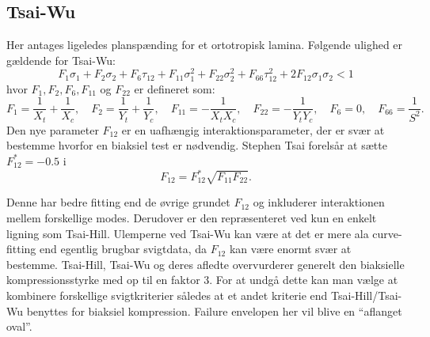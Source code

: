 \subsection{Tsai-Wu}
Her antages ligeledes planspænding for et ortotropisk lamina.
Følgende ulighed er gældende for Tsai-Wu:
\begin{equation*}
  F_1 \sigma_1 + F_2 \sigma_2 + F_6 \tau_{12} + F_{11} \sigma_1^2 + F_{22} \sigma_2^2 + F_{66}\tau_{12}^2 + 2 F_{12} \sigma_1 \sigma_2 < 1
\end{equation*}
hvor $F_1, F_2, F_6, F_{11}$ og $F_{22}$ er defineret som:
\begin{equation*}
  F_1 = \frac{1}{X_t} + \frac{1}{X_c}, \quad F_2 = \frac{1}{Y_t} + \frac{1}{Y_c},  \quad F_{11} = -\frac{1}{X_t X_c}, \quad F_{22} = - \frac{1}{Y_t Y_c}, \quad F_6 = 0, \quad F_{66} = \frac{1}{S^2}
.\end{equation*}
Den nye parameter $F_{12}$ er en uafhængig interaktionsparameter, der er svær at bestemme hvorfor en biaksiel test er nødvendig.
Stephen Tsai forelsår at sætte $F_{12}^{*} = \num{-0,5}$ i
\begin{equation*}
  F_{12} = F_{12}^{*} \sqrt{F_{11} F_{22}}
.\end{equation*}

Denne har bedre fitting end de øvrige grundet $F_{12}$ og inkluderer interaktionen mellem forskellige modes. Derudover er den repræsenteret ved kun en enkelt ligning som Tsai-Hill.
Ulemperne ved Tsai-Wu kan være at det er mere ala curve-fitting end egentlig brugbar svigtdata, da $F_{12}$ kan være enormt svær at bestemme.
Tsai-Hill, Tsai-Wu og deres afledte overvurderer generelt den biaksielle kompressionsstyrke med op til en faktor 3.
For at undgå dette kan man vælge at kombinere forskellige svigtkriterier således at et andet kriterie end Tsai-Hill/Tsai-Wu benyttes for biaksiel kompression.
Failure envelopen her vil blive en ``aflanget oval''.
